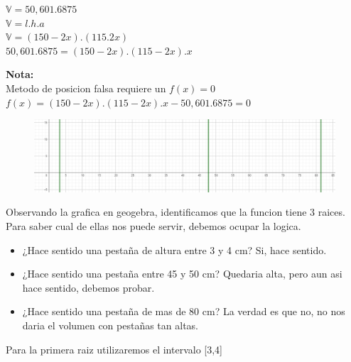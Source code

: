 \documentclass{article}
\theoremstyle{mytheoremstyle}
\theoremstyle{mytheoremstyle}
\theoremstyle{myproblemstyle}
\begin{document}
\noindent $\mathbb{V} = 50,601.6875$
\\$\mathbb{V} = l.h.a$
\\$\mathbb{V} = (150-2x).(115.2x)$
\\$50,601.6875 = (150-2x).(115-2x).x$

\textbf{Nota: }\\Metodo de posicion falsa requiere un $f(x)=0$
\\ $f(x)=(150-2x).(115-2x).x-50,601.6875=0$

\begin{figure}[ht]
    \includegraphics*[scale=0.5]{img/secante2.png}
\end{figure}
Observando la grafica en geogebra, identificamos que la funcion tiene 3 raices. Para saber cual de ellas nos puede servir, debemos ocupar la logica.
\begin{itemize}
    \item ¿Hace sentido una pestaña de altura entre 3 y 4 cm? Si, hace sentido.
    \item ¿Hace sentido una pestaña entre 45 y 50 cm? Quedaria alta, pero aun asi hace sentido, debemos probar.
    \item ¿Hace sentido una pestaña de mas de 80 cm? La verdad es que no, no nos daria el volumen con pestañas tan altas.
\end{itemize}

Para la primera raiz utilizaremos el intervalo [3,4]
\end{document}
